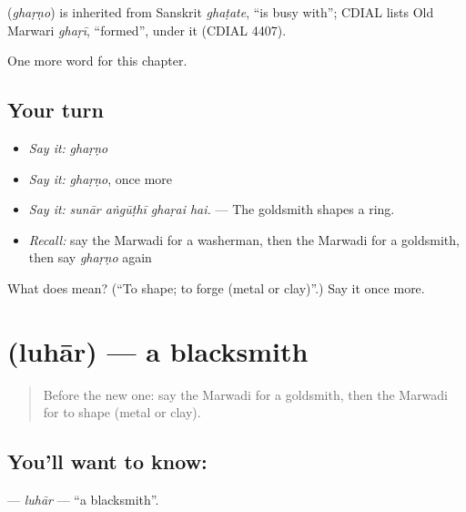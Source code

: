\begin{cousinweb}
\textbf{} (\emph{ghaṛṇo}) is inherited from Sanskrit \emph{ghaṭate}, \textquotedblleft{}is busy with\textquotedblright{}; CDIAL lists Old Marwari \emph{ghaṛī}, \textquotedblleft{}formed\textquotedblright{}, under it (CDIAL 4407).
\end{cousinweb}

\begin{grammarlens}[title={What you've built}]
One more word for this chapter.
\end{grammarlens}

\subsection*{Your turn}
\begin{itemize}
\raggedright
  \item \emph{Say it:} \emph{ghaṛṇo}
  \item \emph{Say it:} \emph{ghaṛṇo}, once more
  \item \emph{Say it:} \emph{sunār aṅgūṭhī ghaṛai hai.} — The goldsmith shapes a ring.
  \item \emph{Recall:} say the Marwadi for a washerman, then the Marwadi for a goldsmith, then say \emph{ghaṛṇo} again
\end{itemize}

\begin{tcolorbox}[breakable,colback=teal!4,colframe=teal!35!black,title={Before you move on}]
What does  mean? (\textquotedblleft{}To shape; to forge (metal or clay)\textquotedblright{}.) Say it once more.
\end{tcolorbox}
\section[\texorpdfstring{\mw{लुहार} (luhār)}{लुहार (luhār)}]{ (luhār) — a blacksmith}

\label{lesson:MW-C264-luhar}



\begin{quote}
Before the new one: say the Marwadi for a goldsmith, then the Marwadi for to shape (metal or clay).
\end{quote}

\subsection*{You'll want to know: }
\textbf{} — \emph{luhār} — \textquotedblleft{}a blacksmith\textquotedblright{}.

